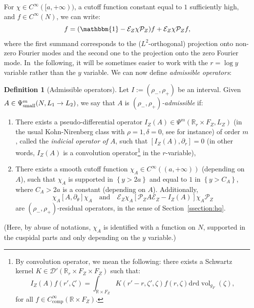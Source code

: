 \documentclass[JEP,XML,SOM,Unicode,NoFloatCountersInSection]{cedram}
\newcommand{\quand}{\quad\text{and}\quad}
\newcommand{\R}{\mathbb{R}}
\newcommand{\mc}{\mathcal}
\newcommand{\E}{\mathcal{E}}
\newcommand{\dd}{\mathrm{d}}
\DeclareMathOperator{\vol}{\mathrm{vol}}
\theoremstyle{plain}
\theoremstyle{definition}
\newtheorem{definition}{Definition}[section]
\begin{document}
For $\chi \in C^\infty([a,+\infty))$, a cutoff function constant equal to $1$ sufficiently high, and $f \in C^\infty(N)$, we can write:
\[
f = (\mathbbm{1}-\E_Z \chi \mc{P}_Z)f + \E_Z \chi \mc{P}_Z f,
\]
where the first summand corresponds to the ($L^2$-orthogonal) projection onto non-zero Fourier modes and the second one to the projection onto the zero Fourier mode. In~the following, it will be sometimes easier to work with the $r=\log y$ variable rather than the $y$ variable. We can now define \emph{admissible operators}:

\begin{definition}[Admissible operators]
\label{definition:rho-admissible}
Let $I := (\rho_-,\rho_+)$ be an interval. Given $A\in \Psi^m_{\textup{small}}(N,L_1 \to L_2)$, we say that $A$ is \emph{$(\rho_-,\rho_+)$-admissible} if:
\begin{enumerate}
\item There exists a pseudo-differential operator $I_Z(A) \in \Psi^m(\R_r \times F_Z, L_Z)$ (in the usual Kohn-Nirenberg class with $\rho=1,\delta=0$, see \cite[Def.\,1.1]{Shubin-01} for instance) of order $m$, called the \emph{indicial operator of $A$}, such that $[I_Z(A),\partial_r] = 0$ (in other words, $I_Z(A)$ is a convolution operator\footnote{By convolution operator, we mean the following: there exists a Schwartz kernel $K \in \mc{D}'(\R_r \times F_Z \times F_Z)$ such that:\vspace*{-3pt}
\[
I_Z(A)f (r',\zeta') = \int_{\R \times F_Z} K(r'-r,\zeta',\zeta) f(r,\zeta) \dd r \dd \vol_{g_F}(\zeta),
\]
for all $f \in C^\infty_{\mathrm{comp}}(\R \times F_Z)$.}
in the $r$-variable),
\item There exists a smooth cutoff function $\chi_A \in C^\infty((a,+\infty))$ (depending on $A$), such that $\chi_A$ is supported in $\left\{y>2a\right\}$ and equal to $1$ in $\left\{y> C_A\right\}$, where $C_A > 2a$ is a constant (depending on $A$). {\color{black}Additionally,}
\begin{equation}
\label{eq:preserving-theta-modes}
\chi_A [A,\partial_\theta] \chi_A \quand \mathcal{E}_Z\chi_A \left[\mathcal{P}_Z A \mathcal{E}_Z - I_Z(A) \right] \chi_A \mathcal{P}_Z
\end{equation}
are $(\rho_-,\rho_+)$-residual operators, in the sense of Section~\ref{ssection:hq}.
\end{enumerate}
(Here, by abuse of notations, $\chi_A$ is identified with a function on $N$, supported in the cuspidal parts and only depending on the $y$ variable.)
\end{definition}
\end{document}

